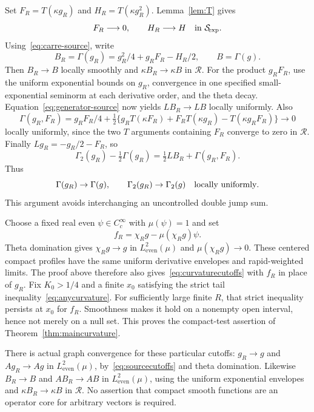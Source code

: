 \documentclass[11pt,a4paper]{article}
\numberwithin{equation}{section}
\theoremstyle{definition}
\theoremstyle{remark}
\newcommand{\He}{L^2_{\mathrm{even}}(\mu)}
\newcommand{\RR}{\mathcal R}
\newcommand{\SSS}{\mathcal S_{\!\exp}}
\begin{document}
Set $F_R=T(\kappa g_R)$ and $H_R=T(\kappa g_R^2)$. Lemma~\ref{lem:T} gives
\begin{equation}\label{eq:sourcecutoffs}
 F_R\longrightarrow0,\qquad H_R\longrightarrow H\quad\hbox{in }\SSS.
\end{equation}
Using~\eqref{eq:carre-source}, write
\[
 B_R=\Gamma(g_R)=g_R^2/4+g_RF_R-H_R/2,
 \qquad B=\Gamma(g).
\]
Then $B_R\to B$ locally smoothly and $\kappa B_R\to\kappa B$ in $\RR$. For the product $g_RF_R$, use the uniform exponential bounds on $g_R$, convergence in one specified small-exponential seminorm at each derivative order, and the theta decay. Equation~\eqref{eq:generator-source} now yields $LB_R\to LB$ locally uniformly. Also
\[
 \Gamma(g_R,F_R)=g_RF_R/4+\tfrac12\{g_RT(\kappa F_R)
                  +F_RT(\kappa g_R)-T(\kappa g_RF_R)\}\longrightarrow0
\]
locally uniformly, since the two $T$ arguments containing $F_R$ converge to zero in $\RR$. Finally $Lg_R=-g_R/2-F_R$, so
\[
 \Gamma_2(g_R)-\tfrac12\Gamma(g_R)
       =\tfrac12LB_R+\Gamma(g_R,F_R).
\]
Thus
\begin{equation}\label{eq:curvaturecutoffs}
 \Gamma(g_R)\to\Gamma(g),\qquad \Gamma_2(g_R)\to\Gamma_2(g)
 \quad\hbox{locally uniformly}.
\end{equation}
This argument avoids interchanging an uncontrolled double jump sum.

Choose a fixed real even $\psi\in C_c^\infty$ with $\mu(\psi)=1$ and set
\begin{equation}\label{eq:centeredcutoff}
 f_R=\chi_Rg-\mu(\chi_Rg)\psi.
\end{equation}
Theta domination gives $\chi_Rg\to g$ in $\He$ and $\mu(\chi_Rg)\to0$. These centered compact profiles have the same uniform derivative envelopes and rapid-weighted limits. The proof above therefore also gives~\eqref{eq:curvaturecutoffs} with $f_R$ in place of $g_R$. Fix $K_0>1/4$ and a finite $x_0$ satisfying the strict tail inequality~\eqref{eq:anycurvature}. For sufficiently large finite $R$, that strict inequality persists at $x_0$ for $f_R$. Smoothness makes it hold on a nonempty open interval, hence not merely on a null set. This proves the compact-test assertion of Theorem~\ref{thm:maincurvature}.

There is actual graph convergence for these particular cutoffs: $g_R\to g$ and $Ag_R\to Ag$ in $\He$, by~\eqref{eq:sourcecutoffs} and theta domination. Likewise $B_R\to B$ and $AB_R\to AB$ in $\He$, using the uniform exponential envelopes and $\kappa B_R\to\kappa B$ in $\RR$. No assertion that compact smooth functions are an operator core for arbitrary vectors is required.
\end{document}
